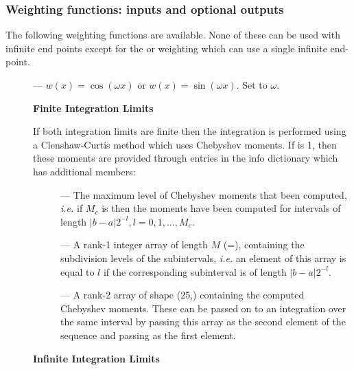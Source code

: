 \subsubsection{Weighting functions: inputs and optional outputs}
The following weighting functions are available.  None of these can be
used with infinite end points except for the  or
 weighting which can use a single infinite end-point.
\begin{description}
\item[] --- $w(x) = \cos(\omega x)$ or $w(x) =
\sin(\omega x)$.  Set  to $\omega$.  

\textbf{Finite Integration Limits}

If both integration limits are finite then the integration is
performed using a Clenshaw-Curtis method which uses Chebyshev moments.
If  is 1, then these moments are provided through entries
in the info dictionary which has additional members:
\begin{description}
\item[] --- The maximum level of Chebyshev moments that 
been computed, {\em i.e.} if $M_c$ is
 then the moments have been computed for
intervals of length $|b-a|2^{-l}, l=0,1,\ldots,M_c$.
\item[] --- A rank-1 integer array of length $M$
(=), containing the subdivision levels of the
subintervals, {\em i.e.} an element of this array is equal to $l$ if
the corresponding subinterval is of length $|b-a| 2^{-l}$.
\item[] --- A rank-2 array of shape (25,)
containing the computed Chebyshev moments.  These can be passed on to
an integration over the same interval by passing this array as the
second element of the sequence  and passing
 as the first element.
\end{description} 

\textbf{Infinite Integration Limits}


\end{description}
